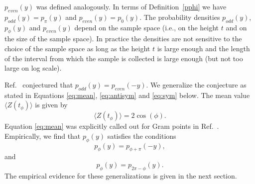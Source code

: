 \documentclass[twoside]{article}
\theoremstyle{definition}
\begin{document}
$p_{even}(y)$ was defined analogously. In terms of Definition~\ref{pphi} we have $p_{odd}(y) = p_{\pi}(y)$ and $p_{even}(y) = p_{0}(y)$.
The probability densities $p_{odd}(y)$,  $p_{\phi}(y)$ and $p_{even}(y)$ depend on the sample space (i.e., on the height $t$ and on the size of the sample space). In practice the densities are not sensitive to the choice of the sample space as long as the height $t$ is large enough and the length of the interval from which the sample is collected is large enough (but not too large on log scale).

Ref.~\cite{Shanker 2018} conjectured that $p_{odd}(y) = p_{even}(-y)$. We generalize the conjecture as stated in Equations \ref{eq:mean}, \ref{eq:antisym} and \ref{eq:sym} below.
The mean value $\langle Z(t_{\phi})\rangle$ is given by
\begin{equation}
\langle Z(t_{\phi})\rangle = 2\cos (\phi).
\label{eq:mean}
\end{equation}
Equation \ref{eq:mean} was explicitly called out for Gram points in Ref.~\cite{Titchmarsh 1986}. Empirically, we find that $p_{\phi}(y)$ satisfies the conditions
\begin{equation}
p_{\phi}(y) = p_{\phi+\pi}(-y),
\label{eq:antisym}
\end{equation}
and
\begin{equation}
p_{\phi}(y) = p_{2\pi-\phi}(y).
\label{eq:sym}
\end{equation}
The empirical evidence for these generalizations is given in the next section.
\end{document}
